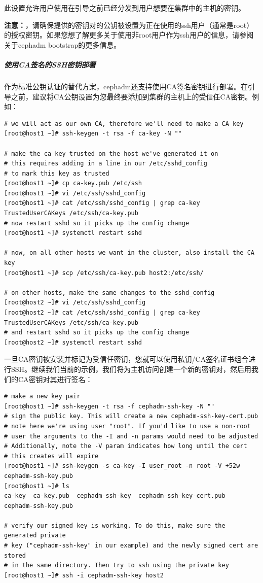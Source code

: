 \documentclass[12pt,UTF8]{ctexbook}
\begin{document}
此设置允许用户使用在引导之前已经分发到用户想要在集群中的主机的密钥。

\textbf{注意：}，请确保提供的密钥对的公钥被设置为正在使用的ssh用户（通常是root）的授权密钥。如果您想了解更多关于使用非root用户作为ssh用户的信息，请参阅关于cephadm bootstrap的更多信息。

\subparagraph{使用CA签名的SSH密钥部署}

作为标准公钥认证的替代方案，cephadm还支持使用CA签名密钥进行部署。在引导之前，建议将CA公钥设置为您最终要添加到集群的主机上的受信任CA密钥。例如：
\begin{verbatim}
# we will act as our own CA, therefore we'll need to make a CA key
[root@host1 ~]# ssh-keygen -t rsa -f ca-key -N ""

# make the ca key trusted on the host we've generated it on
# this requires adding in a line in our /etc/sshd_config
# to mark this key as trusted
[root@host1 ~]# cp ca-key.pub /etc/ssh
[root@host1 ~]# vi /etc/ssh/sshd_config
[root@host1 ~]# cat /etc/ssh/sshd_config | grep ca-key
TrustedUserCAKeys /etc/ssh/ca-key.pub
# now restart sshd so it picks up the config change
[root@host1 ~]# systemctl restart sshd

# now, on all other hosts we want in the cluster, also install the CA key
[root@host1 ~]# scp /etc/ssh/ca-key.pub host2:/etc/ssh/

# on other hosts, make the same changes to the sshd_config
[root@host2 ~]# vi /etc/ssh/sshd_config
[root@host2 ~]# cat /etc/ssh/sshd_config | grep ca-key
TrustedUserCAKeys /etc/ssh/ca-key.pub
# and restart sshd so it picks up the config change
[root@host2 ~]# systemctl restart sshd
\end{verbatim}

一旦CA密钥被安装并标记为受信任密钥，您就可以使用私钥/CA签名证书组合进行SSH。继续我们当前的示例，我们将为主机访问创建一个新的密钥对，然后用我们的CA密钥对其进行签名：
\begin{verbatim}
# make a new key pair
[root@host1 ~]# ssh-keygen -t rsa -f cephadm-ssh-key -N ""
# sign the public key. This will create a new cephadm-ssh-key-cert.pub
# note here we're using user "root". If you'd like to use a non-root
# user the arguments to the -I and -n params would need to be adjusted
# Additionally, note the -V param indicates how long until the cert
# this creates will expire
[root@host1 ~]# ssh-keygen -s ca-key -I user_root -n root -V +52w cephadm-ssh-key.pub
[root@host1 ~]# ls
ca-key  ca-key.pub  cephadm-ssh-key  cephadm-ssh-key-cert.pub  cephadm-ssh-key.pub

# verify our signed key is working. To do this, make sure the generated private
# key ("cephadm-ssh-key" in our example) and the newly signed cert are stored
# in the same directory. Then try to ssh using the private key
[root@host1 ~]# ssh -i cephadm-ssh-key host2
\end{verbatim}
\end{document}
